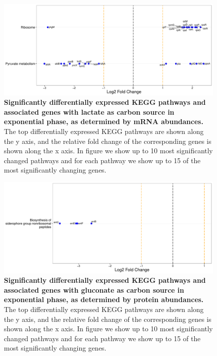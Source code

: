 \documentclass[a4paper]{article}
\begin{document}
\clearpage
\begin{figure}
	\includegraphics[width=1.0\textwidth]{../../d_figures/kegg_03.pdf}
	\caption[Significantly altered KEGG pathways for mRNA samples in exponential phase tested for lactate against glucose]
	{\textbf{Significantly differentially expressed KEGG pathways and associated genes with lactate as carbon source in exponential phase, as determined by mRNA abundances.} The top differentially expressed KEGG pathways are shown along the y axis, and the relative fold change of the corresponding genes is shown along the x axis. In figure we show up to 10 most significantly changed pathways and for each pathway we show up to 15 of the most significantly changing genes.}
\end{figure}

\clearpage
\begin{figure}
	\includegraphics[width=1.0\textwidth]{../../d_figures/kegg_04.pdf}
	\caption[Significantly altered KEGG pathways for protein samples in exponential phase tested for gluconate against glucose]
	{\textbf{Significantly differentially expressed KEGG pathways and associated genes with gluconate as carbon source in exponential phase, as determined by protein abundances.} The top differentially expressed KEGG pathways are shown along the y axis, and the relative fold change of the corresponding genes is shown along the x axis. In figure we show up to 10 most significantly changed pathways and for each pathway we show up to 15 of the most significantly changing genes.}
\end{figure}
\end{document}
